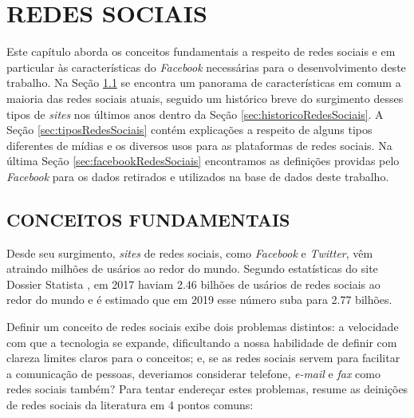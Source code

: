 
%

\chapter{REDES SOCIAIS}
\label{chap:redesSociais}

Este capítulo aborda os conceitos fundamentais a respeito de redes sociais e em particular às características do \textit{Facebook} necessárias para o desenvolvimento deste trabalho. Na Seção \ref{sec:conceitosRedesSociais} se encontra um panorama de características em comum a maioria das redes sociais atuais, seguido um histórico breve do surgimento desses tipos de \textit{sites} nos últimos anos dentro da Seção \ref{sec:historicoRedesSociais}. A Seção \ref{sec:tiposRedesSociais} contém explicações a respeito de alguns tipos diferentes de mídias e os diversos usos para as plataformas de redes sociais. %
Na última Seção \ref{sec:facebookRedesSociais} encontramos as definições providas pelo \textit{Facebook} para os dados retirados e utilizados na base de dados deste trabalho.

\section{CONCEITOS FUNDAMENTAIS}
\label{sec:conceitosRedesSociais}

Desde seu surgimento, \textit{sites} de redes sociais, como \textit{Facebook} e \textit{Twitter}, vêm atraindo milhões de usários ao redor do mundo. Segundo estatísticas do site Dossier Statista , em 2017 haviam 2.46 bilhões de usários de redes sociais ao redor do mundo e é estimado que em 2019 esse número suba para 2.77 bilhões.

Definir um conceito de redes sociais exibe dois problemas distintos: a velocidade com que a tecnologia se expande, dificultando a nossa habilidade de definir com clareza limites claros para o conceitos; e, se as redes sociais servem para facilitar a comunicação de pessoas, deveriamos considerar telefone, \textit{e-mail} e \textit{fax} como redes sociais também? Para tentar endereçar estes problemas,  resume as deinições de redes sociais da literatura em 4 pontos comuns:

